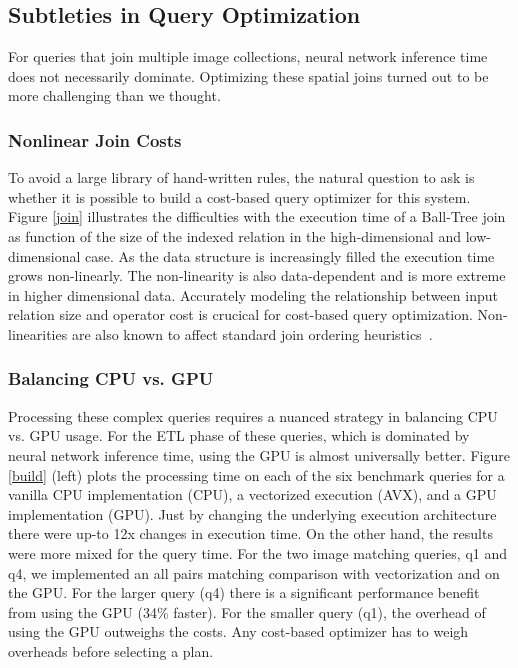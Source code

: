 \subsection{Subtleties in Query Optimization}
For queries that join multiple image collections, neural network inference time does not necessarily dominate.
Optimizing these spatial joins turned out to be more challenging than we thought.

\subsubsection{Nonlinear Join Costs}
To avoid a large library of hand-written rules, the natural question to ask is whether it is possible to build a cost-based query optimizer for this system.
Figure \ref{join} illustrates the difficulties with the execution time of a Ball-Tree join as function of the size of the indexed relation in the high-dimensional and low-dimensional case. As the data structure is increasingly filled the execution time grows non-linearly. The non-linearity is also data-dependent and is more extreme in higher dimensional data. Accurately modeling the relationship between input relation size and operator cost is crucical for cost-based query optimization. Non-linearities are also known to affect standard join ordering heuristics~\cite{krishnan2018deeprljoins}.

\subsubsection{Balancing CPU vs. GPU}
Processing these complex queries requires a nuanced strategy in balancing CPU vs. GPU usage. 
For the ETL phase of these queries, which is dominated by neural network inference time, using the GPU is almost universally better.
Figure \ref{build} (left) plots the processing time on each of the six benchmark queries for a vanilla CPU implementation (CPU), a vectorized execution (AVX), and a GPU implementation (GPU). Just by changing the underlying execution architecture there were up-to 12x changes in execution time. 
On the other hand, the results were more mixed for the query time. 
For the two image matching queries, q1 and q4, we implemented an all pairs matching comparison with vectorization and on the GPU.
For the larger query (q4) there is a significant performance benefit from using the GPU (34\% faster).
For the smaller query (q1), the overhead of using the GPU outweighs the costs.
Any cost-based optimizer has to weigh overheads before selecting a plan.


